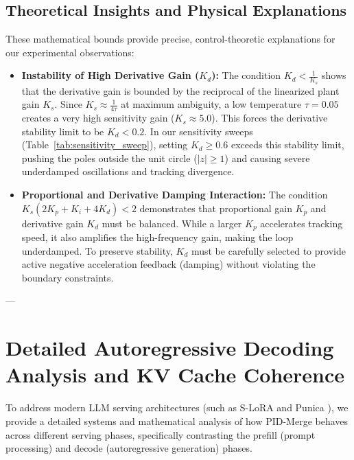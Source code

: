 \subsection{Theoretical Insights and Physical Explanations}
These mathematical bounds provide precise, control-theoretic explanations for our experimental observations:
\begin{itemize}
    \item \textbf{Instability of High Derivative Gain ($K_d$):} The condition $K_d < \frac{1}{K_s}$ shows that the derivative gain is bounded by the reciprocal of the linearized plant gain $K_s$. Since $K_s \approx \frac{1}{4\tau}$ at maximum ambiguity, a low temperature $\tau = 0.05$ creates a very high sensitivity gain ($K_s \approx 5.0$). This forces the derivative stability limit to be $K_d < 0.2$. In our sensitivity sweeps (Table~\ref{tab:sensitivity_sweep}), setting $K_d \ge 0.6$ exceeds this stability limit, pushing the poles outside the unit circle ($|z| \ge 1$) and causing severe underdamped oscillations and tracking divergence.
    \item \textbf{Proportional and Derivative Damping Interaction:} The condition $K_s(2K_p + K_i + 4K_d) < 2$ demonstrates that proportional gain $K_p$ and derivative gain $K_d$ must be balanced. While a larger $K_p$ accelerates tracking speed, it also amplifies the high-frequency gain, making the loop underdamped. To preserve stability, $K_d$ must be carefully selected to provide active negative acceleration feedback (damping) without violating the boundary constraints.
\end{itemize}

---

\section{Detailed Autoregressive Decoding Analysis and KV Cache Coherence}
\label{sec:appendix_autoregressive}

To address modern LLM serving architectures (such as S-LoRA \cite{s-lora} and Punica \cite{chen2023punica}), we provide a detailed systems and mathematical analysis of how PID-Merge behaves across different serving phases, specifically contrasting the prefill (prompt processing) and decode (autoregressive generation) phases.

